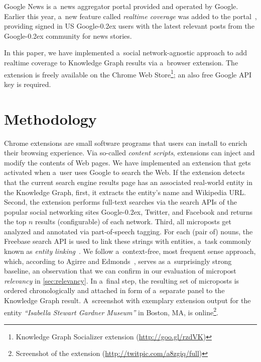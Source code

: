 \documentclass[runningheads,a4paper]{llncs}
\newcommand{\googleplus}{Google\nolinebreak\hspace{0em}\raisebox{.28ex}{\tiny\bf +}\kern-0.2ex\xspace}
\begin{document}
Google News is a~news aggregator portal provided and operated by Google.
Earlier this year, a~new feature called \emph{realtime coverage}
was added to the portal~\cite{zuccarino2012}, providing signed in US \googleplus users
with the latest relevant posts from the \googleplus community for news stories.

In this paper, we have implemented a~social network-agnostic approach
to add realtime coverage to Knowledge Graph results via a~browser extension.
The extension is freely available on the Chrome Web
Store\footnote{Knowledge Graph Socializer extension (\url{http://goo.gl/rzdVK})};
an also free Google API key is required.

\section{Methodology}
Chrome extensions are small software programs that users can install
to enrich their browsing experience.
Via so-called \emph{content scripts}, extensions can inject and modify the contents of Web pages.
We have implemented an extension that gets activated when a~user uses Google to search the Web.
If the extension detects that the current search engine results page
has an associated real-world entity in the Knowledge Graph,
first, it extracts the entity's name and Wikipedia URL.
Second, the extension performs full-text searches via the search APIs of
the popular social networking sites \googleplus, Twitter, and Facebook
and returns the top $n$ results (configurable) of each network.
Third, all microposts get analyzed and annotated via part-of-speech tagging.
For each (pair of) nouns, the Freebase search API is used
to link these strings with entities,
a~task commonly known as \emph{entity linking}~\cite{spitkovsky2012}.
We follow a~context-free, most frequent sense approach,
which, according to Agirre and Edmonds~\cite{agirre2007},
serves as a~surprisingly strong baseline,
an observation that we can confirm in our evaluation of micropost \emph{relevancy}
in \autoref{sec:relevancy}.
In a~final step, the resulting set of microposts is ordered chronologically
and attached in form of a~separate panel to the Knowledge Graph result.
A~screenshot with exemplary extension output for the entity
\emph{``Isabella Stewart Gardner Museum''} in Boston, MA,
is online\footnote{Screenshot of the extension (\url{http://twitpic.com/a8zgiq/full})}. 
\end{document}
